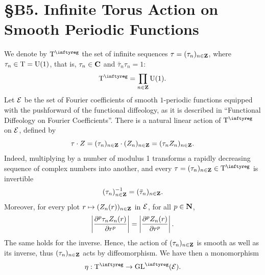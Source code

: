 
\chapter*{\S B5. Infinite Torus Action on Smooth Periodic Functions}
\setcounter{footnote}{0}


\begin{abstract}
  We continue the previous exercise on the space of Fourier coefficients
  of smooth periodic functions, equipped with the functional diffeology,
  by considering the infinite product $\Torus^\infty$ of tori $\U(1)$
  as a group of diffeomorphisms.
\end{abstract}


We denote by $\Torus^\infty$ the set of infinite sequences $\tau = (\tau_n)_{n\in \mathbf{Z}}$, where $\tau_n \in  \mathrm{T} = \mathrm{U}(1)$,
that is,
$\tau_n \in \mathbf{C}$ and $\bar \tau_n \tau_n = 1$:
$$
  \Torus^\infty = \prod_{n \in \ZZ} \U(1).
  $$
Let $\mathcal{E}$ be the set of Fourier coefficients of smooth $1$-periodic functions equipped with the pushforward of the
functional diffeology, as it is described in ``Functional Diffeology on Fourier Coefficients''.
There is a natural linear action of $\Torus^\infty$ on $\mathcal{E}$,
defined by
$$
  \tau \cdot Z = (\tau_n)_{n \in \mathbf{Z}} \cdot (Z_n)_{n \in \mathbf{Z}} = (\tau_n Z_n)_{n \in \mathbf{Z}}.
  $$
Indeed, multiplying by a number of modulus 1 transforms a rapidly decreasing sequence of complex numbers into another,
and every $\tau=(\tau_n)_{n \in \ZZ} \in \Torus^\infty$ is invertible
$$
  (\tau_n)_{n \in \mathbf{Z}}^{-1} = (\bar \tau_n)_{n \in \mathbf{Z}}.
  $$
Moreover, for every plot $r \mapsto (Z_n(r))_{n\in \mathbf{Z}}$ in $\mathcal{E}$, for all $p \in \mathbf{N}$,
$$
  \left|{\partial^p \tau_n Z_n(r) \over \partial r^p}\right| %
  = \left|{\partial^p Z_n(r) \over \partial r^p}\right|.
  $$
The same holds for the inverse. Hence, the action of $(\tau_n)_{n \in \mathbf{Z}}$ is smooth as well as its inverse, thus $(\tau_n)_{n \in \mathbf{Z}}$
acts by diffeomorphism. We have then a monomorphism
$$
  \eta : \Torus^\infty \to \GL^\infty(\cE).
  $$


